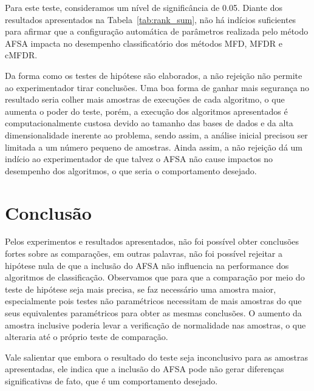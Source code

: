 \documentclass[conference]{IEEEtran}
\begin{document}
Para este teste, consideramos um nível de significância de 0.05.
Diante dos resultados apresentados na Tabela~\ref{tab:rank_sum}, não há indícios suficientes para afirmar que a configuração automática de parâmetros realizada pelo método AFSA impacta no desempenho classificatório dos métodos MFD, MFDR e cMFDR.

Da forma como os testes de hipótese são elaborados, a não rejeição não permite ao experimentador tirar conclusões. 
Uma boa forma de ganhar mais segurança no resultado seria colher mais amostras de execuções de cada algoritmo, o que aumenta o poder do teste, porém, a execução dos algoritmos apresentados é computacionalmente custosa devido ao tamanho das bases de dados e da alta dimensionalidade inerente ao problema, sendo assim, a análise inicial precisou ser limitada a um número pequeno de amostras.
Ainda assim, a não rejeição dá um indício ao experimentador de que talvez o AFSA não cause impactos no desempenho dos algoritmos, o que seria o comportamento desejado.


\section{Conclusão}
\label{sec:conclusao}
Pelos experimentos e resultados apresentados, não foi possível obter conclusões fortes sobre as comparações, em outras palavras, não foi possível rejeitar a hipótese nula de que a inclusão do AFSA não influencia na performance dos algoritmos de classificação.
Observamos que para que a comparação por meio do teste de hipótese seja mais precisa, se faz necessário uma amostra maior, especialmente pois testes não paramétricos necessitam de mais amostras do que seus equivalentes paramétricos para obter as mesmas conclusões.
O aumento da amostra inclusive poderia levar a verificação de normalidade nas amostras, o que alteraria até o próprio teste de comparação.

Vale salientar que embora o resultado do teste seja inconclusivo para as amostras apresentadas, ele indica que a inclusão do AFSA pode não gerar diferenças significativas de fato, que é um comportamento desejado.



% 

\end{document}
